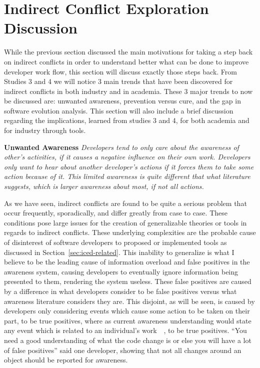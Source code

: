 \section{Indirect Conflict Exploration Discussion}

While the previous section discussed the main motivations for taking a step back on indirect conflicts in order to understand
better what can be done to improve developer work flow, this section will discuss exactly those steps back. From Studies 3 and
4 we will notice 3 main trends that have been discovered for indirect conflicts in both industry and in academia. These 3 major
trends to now be discussed are: unwanted awareness, prevention versus cure, and the gap in software evolution analysis. This
section will also include a brief discussion regarding the implications, learned from studies 3 and 4, for both academia and
for industry through tools.

\textbf{Unwanted Awareness} \textit{Developers tend to only care about the awareness of other's activities, if it causes
a negative influence on their own work. Developers only want to hear about another developer's actions if it forces them
to take some action because of it. This limited awareness is quite different that what literature suggests, which is larger
awareness about most, if not all actions.}

As we have seen, indirect conflicts are found to be quite a serious problem that occur frequently,
sporadically, and differ greatly from case to case. These conditions pose large issues for the creation of generalizable theories
or tools in regards to indirect conflicts. These underlying complexities are the probable cause of disinterest of software developers
to proposed or implemented tools as discussed in Section~\ref{sec:iced-related}. This inability to generalize is what I believe to be the
leading cause of information overload and false positives in the awareness system, causing developers to eventually ignore 
information being presented to them, rendering the system useless. These false positives are caused by a difference in what
developers consider to be false positives versus what awareness literature considers they are. This disjoint, as will
be seen, is caused by developers only considering events which cause some action to be taken on their part, to be true positives,
where as current awareness understanding would state any event which is related to an individual's 
work~\cite{Herbsleb06collaborationin}~\cite{Cataldo:2008:SCF}, to be true positives.
``You need a good understanding of what the code change is or else you will have a lot of false positives'' said one developer,
showing that not all changes around an object should be reported for awareness.


